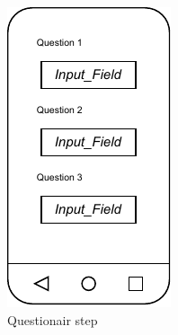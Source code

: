 \begin{figure}[htbp]
    \begin{subfigure}[b]{0.3\textwidth}
        \centering
        \includegraphics[width=\textwidth]{content/05_design_and_dev_artefacts/ActivityQuestionair.drawio.pdf}
        \caption{ Questionair step}
        \label{subfig:Questionair}
    \end{subfigure}
    \hfill
    \begin{subfigure}[b]{0.3\textwidth}
        \centering

\end{subfigure}
\end{figure}
